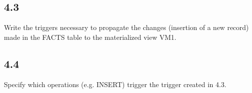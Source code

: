 \subsection{4.3}
\begin{question}
    Write the triggers necessary to propagate the changes (insertion of a new record)
made in the FACTS table to the materialized view VM1.
\end{question}

\begin{answer}
\end{answer}

\subsection{4.4}
\begin{question}
     Specify which operations (e.g. INSERT) trigger the trigger created in 4.3.
\end{question}

\begin{answer}
\end{answer}
